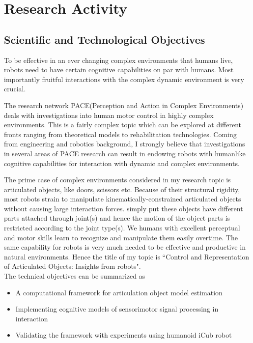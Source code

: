 \documentclass[12pt,a4paper]{report}
\begin{document}
\section{Research Activity}
\subsection{Scientific and Technological Objectives}

To be effective in an ever changing complex environments that humans live, robots need to have certain cognitive capabilities on par with humans. Most importantly fruitful interactions with the complex dynamic environment is very crucial. 

The research network PACE(Perception and Action in Complex Environments) deals with investigations into human motor control in highly complex environments. This is a fairly complex topic which can be explored at different fronts ranging from theoretical models to rehabilitation technologies. Coming from engineering and robotics background, I strongly believe that investigations in several areas of PACE research can result in endowing robots with humanlike cognitive capabilities for interaction with dynamic and complex environments. 

The prime case of complex environments considered in my research topic is articulated objects, like doors, scissors etc. Because of their structural rigidity, most robots strain to manipulate kinematically-constrained articulated objects without causing large interaction forces. simply put these objects have different parts attached through joint(s) and hence the motion of the object parts is restricted according to the joint type(s). We humans with excellent perceptual and motor skills learn to recognize and manipulate them easily overtime. The same capability for robots is very much needed to be effective and productive in natural environments. Hence the title of my topic is ``Control and Representation of Articulated Objects: Insights from robots". \\

The technical objectives can be summarized as 
\begin{itemize}
	\item A computational framework for articulation object model estimation
	\item Implementing cognitive models of sensorimotor signal processing in interaction 
	\item Validating the framework with experiments using humanoid iCub robot
\end{itemize}
\end{document}
